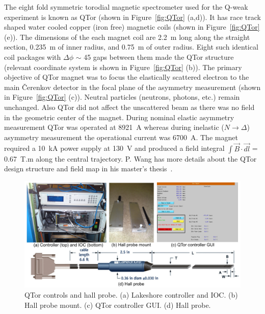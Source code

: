 The eight fold symmetric torodial magnetic spectrometer used for the Q-weak experiment is known as QTor (shown in Figure~\ref{fig:QTor} (a,d)). It has race track shaped water cooled copper (iron free) magnetic coils (shown in Figure~\ref{fig:QTor} (e)). The dimensions of the each magnet coil are 2.2~m long along the straight section, 0.235~m of inner radius, and 0.75~m of outer radius. Eight such identical coil packages with $\Delta\phi$ $\sim$ 45\degrees{} gaps between them made the QTor structure (relevant coordinate system is shown in Figure~\ref{fig:QTor} (b)). The primary objective of QTor magnet was to focus the elastically scattered electron to the main \v{C}erenkov detector in the focal plane of the asymmetry measurement (shown in Figure~\ref{fig:QTor} (c)). 
Neutral particles (neutrons, photons, etc.) remain unchanged. Also QTor did not affect the unscattered beam as there was no field in the geometric center of the magnet.
During nominal elastic asymmetry measurement QTor was operated at 8921~A whereas during inelastic ($N\rightarrow\Delta$) asymmetry measurement the operational current was 6700~A. The magnet required a 10~kA power supply at 130~V and produced a field integral $\int \vec{B} \cdot \vec{dl}$ = 0.67~T.m along the central trajectory. P. Wang has more details about the QTor design structure and field map in his master's thesis~\cite{peiqing_qweak_masters}.


\begin{singlespace}
\begin{figure}[!h]
	\begin{center}
	\includegraphics[width=15cm]{figures/QTorHallProbe}
	\caption
	{QTor controls and hall probe. (a) Lakeshore controller and IOC. (b) Hall probe mount. (c) QTor controller GUI. (d) Hall probe. }
	\label{fig:QTorHallProbe}
	\end{center}
\end{figure}
\end{singlespace}

